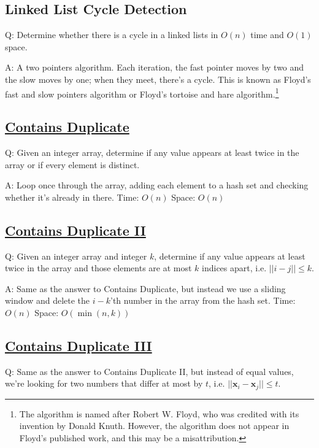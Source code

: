 \documentclass[8pt, table, xcdraw]{article}%
\begin{document}
\subsection{Linked List Cycle Detection}

Q: Determine whether there is a cycle in a linked lists in $O(n)$ time and $O(1)$ space.

A: A two pointers algorithm. Each iteration, the fast pointer moves by two and the slow moves by one; when they meet, there's a cycle. This is known as Floyd's fast and slow pointers algorithm or Floyd's tortoise and hare algorithm.\footnote{The algorithm is named after Robert W. Floyd, who was credited with its invention by Donald Knuth. However, the algorithm does not appear in Floyd's published work, and this may be a misattribution.}

\subsection{\href{https://leetcode.com/problems/contains-duplicate}{Contains Duplicate}}

Q: Given an integer array, determine if any value appears at least twice in the array or if every element is distinct.

A: Loop once through the array, adding each element to a hash set and checking whether it's already in there. Time: $O(n)$ Space: $O(n)$

\subsection{\href{https://leetcode.com/problems/contains-duplicate-ii}{Contains Duplicate II}}

Q: Given an integer array and integer $k$, determine if any value appears at least twice in the array and those elements are at most $k$ indices apart, i.e. $||i - j|| \leq k$.

A: Same as the answer to Contains Duplicate, but instead we use a sliding window and delete the $i - k$'th number in the array from the hash set. Time: $O(n)$ Space: $O(\min(n,k))$

\subsection{\href{https://leetcode.com/problems/contains-duplicate-iii}{Contains Duplicate III}}

Q: Same as the answer to Contains Duplicate II, but instead of equal values, we're looking for two numbers that differ at most by $t$, i.e. $||\mathbf{x}_i - \mathbf{x}_j|| \leq t$.
\end{document}
